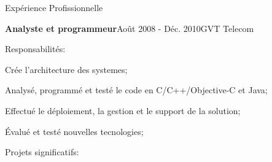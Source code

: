 \documentclass{resume}
\begin{document}
\begin{rSection}{Expérience Profissionnelle}
\begin{rSubsection}{\bf Analyste et programmeur}{Août 2008 - Déc. 2010}{GVT Telecom}{}
      \begin{rSubsection}{Responsabilités:}{}{}{}
        \item Crée l’architecture des systemes;
        \item Analysé, programmé et testé le code en C/C++/Objective-C et Java;
        \item Effectué le déploiement, la gestion et le support de la solution;
        \item Évalué et testé nouvelles tecnologies;
      \end{rSubsection}

      \begin{rSubsection}{Projets significatifs:}{}{}{}


\end{rSubsection}
\end{rSubsection}
\end{rSection}
\end{document}
